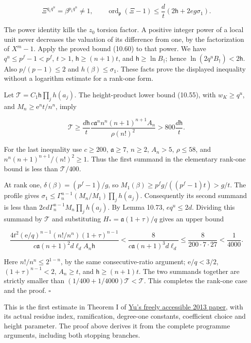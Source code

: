 \documentclass[
  11pt,
  a4paper,
]{article}
\begin{document}
\[
\Xi^{q_1q^u}=\beta^{p_1q^u}\ne1,\qquad
\operatorname{ord}_{\mathfrak p}(\Xi-1)
\le\frac d t\left(2\mathsf h+2eg\sigma_1\right).
\tag{10.454}
\]

The power identity kills the \(z_0\) torsion factor. A positive integer
power of a local unit never decreases the valuation of its difference
from one, by the factorization of \(X^m-1\). Apply the proved bound
(10.60) to that power. We have \(q^u\le p^f-1<p^f\), \(t>1\),
\(\mathsf h\ge(n+1)t\), and \(\mathsf h\ge\ln B_\dagger\); hence
\(\ln(2q^uB_\dagger)<2\mathsf h\). Also \(p/(p-1)\le2\) and
\(h(\beta)\le\sigma_1\). These facts prove the displayed inequality
without a logarithm estimate for a rank-one form.

Let \(\mathcal T=C_1\mathsf h\prod_jh(a_j)\). The height-product lower
bound (10.55), with \(w_K\ge q^u\), and \(M_n\ge\mathrm e^nt/n^n\),
imply

\[
\mathcal T\ge\frac{d\mathsf h}{t}
\frac{c\mathfrak a^n n^n(n+1)^{n+1}A_n}{\rho(n!)^2}
>800\frac{d\mathsf h}{t}.
\tag{10.455}
\]

For the last inequality use \(c\ge200\), \(\mathfrak a\ge7\), \(n\ge2\),
\(A_n>5\), \(\rho\le58\), and \(n^n(n+1)^{n+1}/(n!)^2\ge1\). Thus the
first summand in the elementary rank-one bound is less than
\(\mathcal T/400\).

At rank one, \(\delta(\beta)=(p^f-1)/g\), so
\(M_1(\beta)\ge p^fg/((p^f-1)t)>g/t\). The profile gives
\(\sigma_1\le\Gamma_n^{n-1}(M_n/M_1)\prod_jh(a_j)\). Consequently its
second summand is less than \(2ed\Gamma_n^{n-1}M_n\prod_jh(a_j)\). By
Lemma 10.73, \(eq^u\le2d\). Dividing this summand by \(\mathcal T\) and
substituting \(H_*=\mathfrak a(1+\tau)/q\) gives an upper bound

\[
\frac{4t^2(\mathrm e/q)^{n-1}(n!/n^n)(1+\tau)^{n-1}}
{c\mathfrak a(n+1)^2d\ell_d A_n\mathsf h}
<\frac8{c\mathfrak a(n+1)^3d\ell_d}
\le\frac8{200\cdot7\cdot27}<\frac1{4000}.
\tag{10.456}
\]

Here \(n!/n^n\le2^{1-n}\), by the same consecutive-ratio argument;
\(\mathrm e/q<3/2\), \((1+\tau)^{n-1}<2\), \(A_n\ge t\), and
\(\mathsf h\ge(n+1)t\). The two summands together are strictly smaller
than \((1/400+1/4000)\mathcal T<\mathcal T\). This completes the
rank-one case and the proof. \(\square\)

This is the first estimate in Theorem I of
\href{https://archive.ymsc.tsinghua.edu.cn/pacm_download/117/6782-11511_2013_Article_106.pdf}{Yu's
freely accessible 2013 paper}, with its actual residue index,
ramification, degree-one constants, coefficient choice and height
parameter. The proof above derives it from the complete programme
arguments, including both stopping branches.
\end{document}

